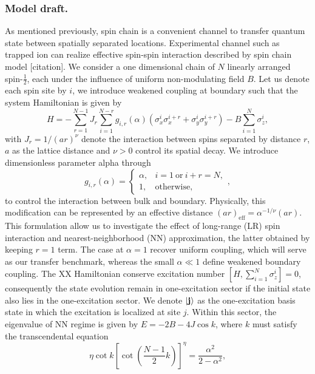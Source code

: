 \documentclass[../../../main.tex]{subfiles}
\begin{document}
\subsubsection{Model draft.}
As mentioned previously, spin chain is a convenient channel to transfer quantum state between spatially separated locations.
Experimental channel such as trapped ion can realize effective spin-spin interaction described by spin chain model [citation].
We consider a one dimensional chain  of $N$ linearly arranged spin-$\tfrac12$, each under the influence of uniform non-modulating field $B$.
Let us denote each spin site by $i$, we introduce weakened coupling at boundary such that the system Hamiltonian is given by 
\begin{equation}
  H= -\sum_{r=1}^{N-1}J_r \sum_{i=1}^{N-r} g_{i,r}(\alpha) \left( \sigma_x^i\sigma_x^{i+r} + \sigma_y^i\sigma_y^{i+r} \right) -B\sum_{i=1}^{N}\sigma_z^i,
\end{equation}
with $J_r = 1/(ar)^\nu$ denote the interaction between spins separated by distance $r$, $a$ as the lattice distance and $\nu>0$ control its spatial decay.
We introduce dimensionless parameter alpha through
\begin{equation}
  g_{i,r}(\alpha)= 
  \begin{cases} 
    \alpha, & i=1\ \text{or}\ i+r=N, \\[2mm] 
    1, &\text{otherwise},
  \end{cases},
\end{equation}
to control the interaction between bulk and boundary.
Physically, this modification can be represented by an effective distance \((ar)_{\mathrm{eff}}=\alpha^{-1/\nu}(ar)\).
This formulation allow us to investigate the effect of long-range (LR) spin interaction and nearest-neighborhood (NN) approximation, the latter obtained by keeping $r=1$ term.
The case at $\alpha=1$ recover uniform coupling, which will serve as our transfer benchmark, whereas the small $\alpha\ll1$ define weakened boundary coupling.
The XX Hamiltonian conserve excitation number $[H,\textstyle\sum_{i=1}^{N}\sigma_z^i]=0$, consequently the state evolution remain in one-excitation sector if the initial state also lies in the one-excitation sector.
We denote  $\ket{\mathbf{j}}$ as the one-excitation basis state in which the excitation is localized at site $j$.
Within this sector, the eigenvalue of NN regime is given by $E = -2B - 4J \cos k$, where $k$ must satisfy the transcendental equation
\begin{equation}
  \eta\cot k \left[ \cot\left(\frac{N-1}{2}k\right) \right]^\eta  = \frac{\alpha^2}{2-\alpha^2},
\end{equation}
\end{document}
